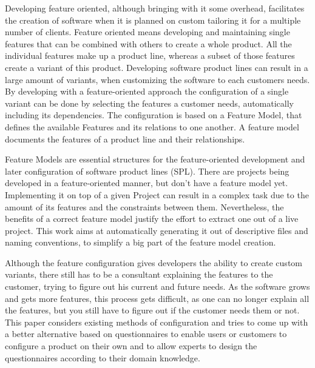 % 
% 
% 
% 
Developing feature oriented, although bringing with it some overhead, facilitates the creation of software when it is planned on custom tailoring it for a multiple number of clients. Feature oriented means developing and maintaining single features that can be combined with others to create a whole product. All the individual features make up a product line, whereas a subset of those features create a variant of this product. Developing software product lines can result in a large amount of variants, when customizing the software to each customers needs. By developing with a feature-oriented approach the configuration of a single variant can be done by selecting the features a customer needs, automatically including its dependencies. The configuration is based on a Feature Model, that defines the available Features and its relations to one another. A feature model documents the features of a product line and their relationships\cite{fospl}.

Feature Models are essential structures for the feature-oriented development and later configuration of software product lines (SPL). There are projects being developed in a feature-oriented manner, but don't have a feature model yet. Implementing it on top of a given Project can result in a complex task due to the amount of its features and the constraints between them. Nevertheless, the benefits of a correct feature model justify the effort to extract one out of a live project. This work aims at automatically generating it out of descriptive files and naming conventions, to simplify a big part of the feature model creation.

Although the feature configuration gives developers the ability to create custom variants, there still has to be a consultant explaining the features to the customer, trying to figure out his current and future needs. As the software grows and gets more features, this process gets difficult, as one can no longer explain all the features, but you still have to figure out if the customer needs them or not. This paper considers existing methods of configuration and tries to come up with a better alternative based on questionnaires to enable users or customers to configure a product on their own and to allow experts to design the questionnaires according to their domain knowledge.
 
